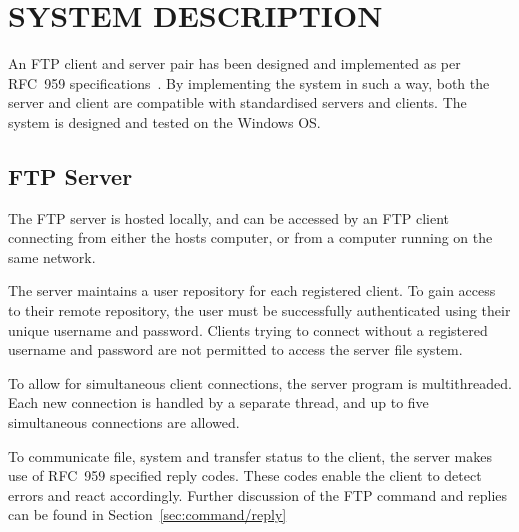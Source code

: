\documentclass[10pt,twocolumn]{witseiepaper}
\begin{document}

\section{SYSTEM DESCRIPTION} 

An FTP client and server pair has been designed and implemented as per RFC~959 specifications~\cite{rfc959}. By implementing the system in such a way, both the server and client are compatible with standardised servers and clients. The system is designed and tested on the  Windows OS.

\subsection{FTP Server}

The FTP server is hosted locally, and can be accessed by an FTP client connecting from either the hosts computer, or from a computer running on the same network. 

The server maintains a user repository for each registered client. To gain access to their remote repository, the user must be successfully authenticated using their unique username and password. Clients trying to connect without a registered username and password are not permitted to access the server file system.


To allow for simultaneous client connections, the server program is multithreaded. Each new connection is handled by a separate thread, and up to five simultaneous connections are allowed. 

To communicate file, system and transfer status to the client, the server makes use of RFC~959 specified reply codes. These codes enable the client to detect errors and react accordingly. Further discussion of the FTP command and replies can be found in Section~\ref{sec:command/reply}
\end{document}
